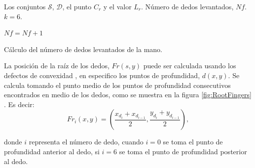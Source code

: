 \begin{algorithm}[h!]
\begin{algorithmic}[1]
\REQUIRE Los conjuntos $\mathcal{S}$, $\mathcal{D}$, el punto $C_r$ y el valor $L_r$.   
\ENSURE Número de dedos levantados, $Nf$.  
	\STATE $k=6$. 	
	
	\STATE $Nf=Nf+1$
	\ENDIF 
\ENDFOR 

\caption{Cálculo del número de dedos levantados de la mano.}
\label{alg:NumDedos} 
\end{algorithmic}
\end{algorithm} 

La posición de la raíz de los dedos, $Fr(s,y)$ puede ser calculada usando los defectos de convexidad \citep{Hummel2014}, en especifico los puntos de profundidad, $d(x,y)$. Se calcula tomando el punto medio de los puntos de profundidad consecutivos encontrados en medio de los dedos, como se muestra en la figura \ref{fig:RootFingers} . Es decir: 
\begin{equation}
Fr_i(x,y)= \left( \frac{ x_{d_i}+x_{d_{i-1}} }{2},\frac{y_{d_i}+y_{d_{i-1}}}{2}  \right),
\end{equation}

donde $i$ representa el número de dedo, cuando $i=0$ se toma el punto de profundidad anterior al dedo, si $i=6$ se toma el punto de profundidad posterior al dedo. 

